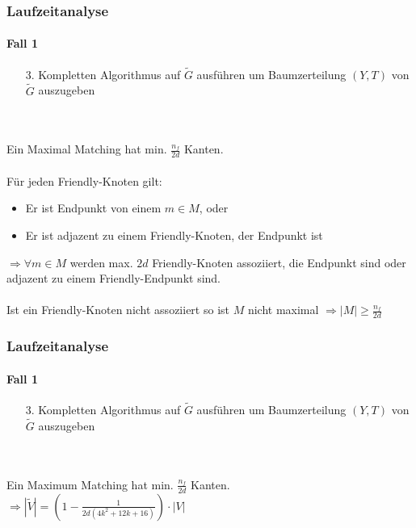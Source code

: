 \begin{frame} %
\frametitle{Laufzeitanalyse}
\framesubtitle{Fall 1}

\begin{enumerate}
	\item[3.] Kompletten Algorithmus auf $\widetilde{G}$ ausführen um Baumzerteilung $(Y,T)$ von $\widetilde{G}$ auszugeben
\end{enumerate}
\ \\
\ \\
Ein Maximal Matching hat min. $\frac{n_f}{2 d}$ Kanten. \\
\ \\
Für jeden Friendly-Knoten gilt:
\begin{itemize}
	\item Er ist Endpunkt von einem $m \in M$, oder
	\item Er ist adjazent zu einem Friendly-Knoten, der Endpunkt ist
\end{itemize}
$\Rightarrow \forall m \in M$ werden max. $2d$ Friendly-Knoten assoziiert, die Endpunkt sind oder adjazent zu einem Friendly-Endpunkt sind.\\
\ \\
Ist ein Friendly-Knoten nicht assoziiert so ist $M$ nicht maximal $\Rightarrow |M| \geq \frac{n_f}{2d}$
\end{frame}

\begin{frame} %
\frametitle{Laufzeitanalyse}
\framesubtitle{Fall 1}

\begin{enumerate}
	\item[3.] Kompletten Algorithmus auf $\widetilde{G}$ ausführen um Baumzerteilung $(Y,T)$ von $\widetilde{G}$ auszugeben
\end{enumerate}
\ \\
\ \\
Ein Maximum Matching hat min. $\frac{n_f}{2d}$ Kanten. \\
$\Rightarrow |\widetilde{V}| = (1 - \frac{1}{2d(4k^2+12k+16)}) \cdot |V|$
\end{frame}



